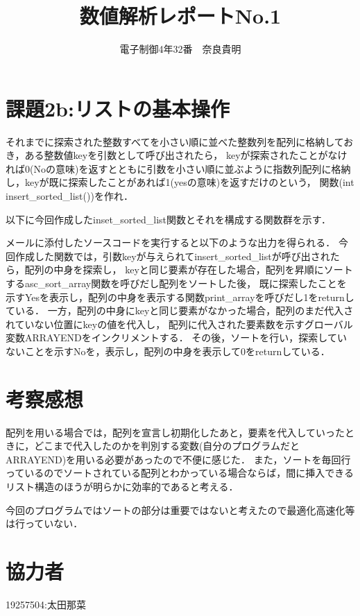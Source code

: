 \documentclass[titlepage]{jarticle}
\title{数値解析レポートNo.1}
\author{電子制御4年32番　奈良貴明}
\begin{document}
\section*{課題2b:リストの基本操作}

それまでに探索された整数すべてを小さい順に並べた整数列を配列に格納しておき，ある整数値keyを引数として呼び出されたら，
keyが探索されたことがなければ0(Noの意味)を返すとともに引数を小さい順に並ぶように指数列配列に格納し，keyが既に探索したことがあれば1(yesの意味)を返すだけのという，
関数(int insert\_sorted\_list())を作れ． 

以下に今回作成したinset\_sorted\_list関数とそれを構成する関数群を示す．

メールに添付したソースコードを実行すると以下のような出力を得られる．
今回作成した関数では，引数keyが与えられてinsert\_sorted\_listが呼び出されたら，配列の中身を探索し，
keyと同じ要素が存在した場合，配列を昇順にソートするasc\_sort\_array関数を呼びだし配列をソートした後，
既に探索したことを示すYesを表示し，配列の中身を表示する関数print\_arrayを呼びだし1をreturnしている．
一方，配列の中身にkeyと同じ要素がなかった場合，配列のまだ代入されていない位置にkeyの値を代入し，
配列に代入された要素数を示すグローバル変数ARRAYENDをインクリメントする．
その後，ソートを行い，探索していないことを示すNoを，表示し，配列の中身を表示して0をreturnしている．
\section*{考察感想}
配列を用いる場合では，配列を宣言し初期化したあと，要素を代入していったときに，どこまで代入したのかを判別する変数(自分のプログラムだとARRAYEND)を用いる必要があったので不便に感じた．
また，ソートを毎回行っているのでソートされている配列とわかっている場合ならば，間に挿入できるリスト構造のほうが明らかに効率的であると考える．

今回のプログラムではソートの部分は重要ではないと考えたので最適化高速化等は行っていない．

\section*{協力者}
19257504:太田那菜
\end{document}
